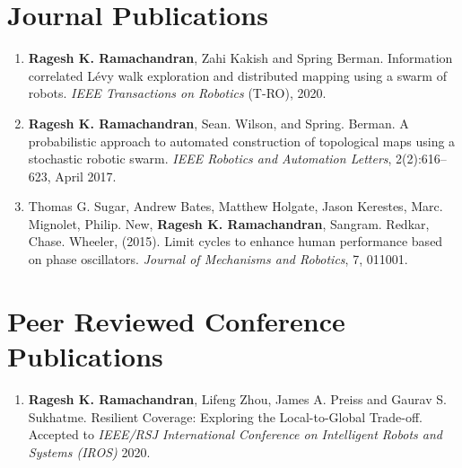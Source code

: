 \documentclass[margin,line]{res}
\begin{document}
\begin{resume}
\section{\sc Journal Publications}
\begin{enumerate}
	\item \textbf{Ragesh K. Ramachandran}, Zahi Kakish and Spring Berman. Information correlated L\'evy walk exploration and distributed mapping using a swarm of robots. \textit{IEEE Transactions on Robotics} (T-RO), 2020.	
	
	\item \textbf{Ragesh K. Ramachandran}, Sean. Wilson, and Spring. Berman. A probabilistic approach to automated construction of topological maps using a stochastic robotic swarm. \textit{IEEE Robotics and	Automation Letters}, 2(2):616–623, April 2017.
	
	\item Thomas G. Sugar, Andrew Bates, Matthew Holgate, Jason Kerestes, Marc. Mignolet, Philip. New, \textbf{Ragesh K. Ramachandran}, Sangram. Redkar, Chase. Wheeler, (2015). Limit cycles to enhance human performance based on phase oscillators. \textit{Journal of Mechanisms and Robotics}, 7, 011001.
	
\end{enumerate}



%
%



\section{\sc Peer Reviewed Conference Publications}
\begin{enumerate}
	\item \textbf{Ragesh K. Ramachandran}, Lifeng Zhou, James A. Preiss and Gaurav S. Sukhatme. Resilient  Coverage:  Exploring  the  Local-to-Global  Trade-off. Accepted to \textit{ IEEE/RSJ International Conference on Intelligent Robots and Systems (IROS)} 2020.	
	

\end{enumerate}
\end{resume}
\end{document}

